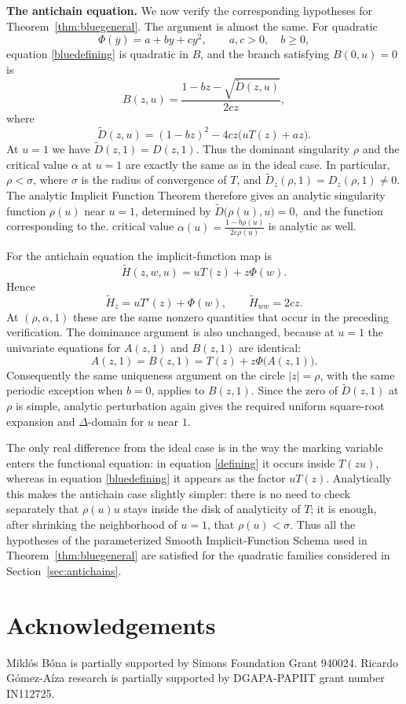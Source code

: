 \documentclass[10pt,a4paper]{amsart}
\theoremstyle{remark}
\begin{document}
\medskip
\noindent\textbf{The antichain equation.}
We now verify the corresponding hypotheses for
Theorem~\ref{thm:bluegeneral}.  The argument is almost the same.  For
quadratic
\[
\Phi(y)=a+by+cy^2,
\qquad a,c>0,\quad b\geq0,
\]
equation \eqref{bluedefining} is quadratic in $B$, and the branch satisfying
$B(0,u)=0$ is
\[
B(z,u)=\frac{1-bz-\sqrt{\widetilde D(z,u)}}{2cz},
\]
where
\[
\widetilde D(z,u)
=
(1-bz)^2-4cz\bigl(uT(z)+az\bigr).
\]
At $u=1$ we have
$
\widetilde D(z,1)=D(z,1).
$
Thus the dominant singularity $\rho$ and the critical value $\alpha$ at
$u=1$ are exactly the same as in the ideal case.  In particular,
$\rho<\sigma$, where $\sigma$ is the radius of convergence of $T$, and
$\widetilde D_z(\rho,1)=D_z(\rho,1)\neq0$.  The analytic Implicit Function
Theorem therefore gives an analytic singularity function $\rho(u)$ near
$u=1$, determined by
$
\widetilde D\big(\rho(u),u\big)=0,
$
and the function corresponding to the. critical value
$
\alpha(u)=\frac{1-b\rho(u)}{2c\rho(u)}
$
is analytic as well.

For the antichain equation the implicit-function map is
\[
\widetilde H(z,w,u)=uT(z)+z\Phi(w).
\]
Hence
\[
\widetilde H_z=uT'(z)+\Phi(w),
\qquad
\widetilde H_{ww}=2cz.
\]
At $(\rho,\alpha,1)$ these are the same nonzero quantities that occur in
the preceding verification.  The dominance argument is also unchanged,
because at $u=1$ the univariate equations for $A(z,1)$ and $B(z,1)$ are
identical:
\[
A(z,1)=B(z,1)=T(z)+z\Phi\bigl(A(z,1)\bigr).
\]
Consequently the same uniqueness argument on the circle $|z|=\rho$, with
the same periodic exception when $b=0$, applies to $B(z,1)$.  Since the
zero of $\widetilde D(z,1)$ at $\rho$ is simple, analytic perturbation again
gives the required uniform square-root expansion and $\Delta$-domain for
$u$ near $1$.

The only real difference from the ideal case is in the way the marking
variable enters the functional equation: in equation \eqref{defining} it occurs
inside $T(zu)$, whereas in equation \eqref{bluedefining} it appears as the factor
$uT(z)$.  Analytically this makes the antichain case slightly simpler:
there is no need to check separately that $\rho(u)u$ stays inside the disk
of analyticity of $T$; it is enough, after shrinking the neighborhood of
$u=1$, that $\rho(u)<\sigma$.  Thus all the hypotheses of the parameterized
Smooth Implicit-Function Schema used in
Theorem~\ref{thm:bluegeneral} are satisfied for the quadratic families
considered in Section~\ref{sec:antichains}.

\section*{Acknowledgements}
Mikl\'os B\'ona  is partially supported by Simons Foundation Grant 940024.
Ricardo Gómez-Aíza research is partially supported by DGAPA-PAPIIT grant number IN112725.
\end{document}
